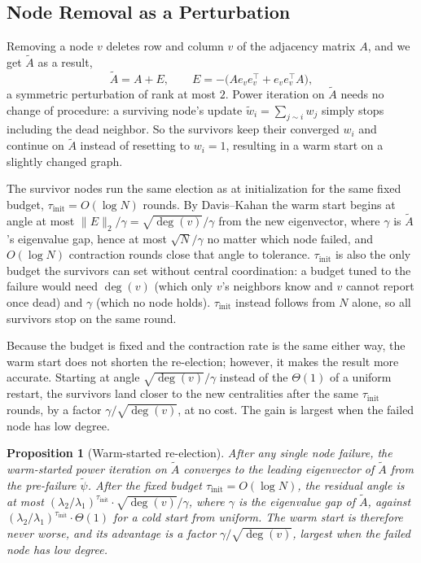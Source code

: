\documentclass[letterpaper]{article} %
\newtheorem{proposition}{Proposition}
\begin{document}
\subsection{Node Removal as a Perturbation}
\label{sec:perturbation}

Removing a node $v$ deletes row and column $v$ of the adjacency matrix $A$, and
we get $\tilde A$ as a result,
\[
	\tilde A = A + E, \qquad E = -\bigl(A e_v e_v^\top + e_v e_v^\top A\bigr),
\]
a symmetric perturbation of rank at most $2$. Power iteration on $\tilde A$
needs no change of procedure: a surviving node's update $\tilde w_i =
\sum_{j\sim i} w_j$ simply stops including the dead neighbor. So the survivors
keep their converged $w_i$ and continue on $\tilde A$ instead of resetting to
$w_i = 1$, resulting in a warm start on a slightly changed graph.

The survivor nodes run the same election as at initialization for the same
fixed budget, $\tau_{\mathrm{init}} = O(\log N)$ rounds. By Davis--Kahan
\citep{daviskahan1970} the warm start begins at angle at most $\|E\|_2/\gamma =
\sqrt{\deg(v)}/\gamma$ from the new eigenvector, where $\gamma$ is $\tilde A$'s
eigenvalue gap, hence at most $\sqrt{N}/\gamma$ no matter which node failed,
and $O(\log N)$ contraction rounds close that angle to tolerance.
$\tau_{\mathrm{init}}$ is also the only budget the survivors can set without
central coordination: a budget tuned to the failure would need $\deg(v)$ (which
only $v$'s neighbors know and $v$ cannot report once dead) and $\gamma$ (which
no node holds). $\tau_{\mathrm{init}}$ instead follows from $N$ alone, so all
survivors stop on the same round.

Because the budget is fixed and the contraction rate is the same either way,
the warm start does not shorten the re-election; however, it makes the result
more accurate. Starting at angle $\sqrt{\deg(v)}/\gamma$ instead of the
$\Theta(1)$ of a uniform restart, the survivors land closer to the new
centralities after the same $\tau_{\mathrm{init}}$ rounds, by a factor
$\gamma/\sqrt{\deg(v)}$, at no cost. The gain is largest when the failed node
has low degree.

\begin{proposition}[Warm-started re-election]
\label{prop:reelection}
After any single node failure, the warm-started power iteration on $\tilde A$
converges to the leading eigenvector of $\tilde A$ from the pre-failure
$\tilde\psi$. After the fixed budget $\tau_{\mathrm{init}} = O(\log N)$, the
residual angle is at most
$(\lambda_2/\lambda_1)^{\tau_{\mathrm{init}}}\cdot\sqrt{\deg(v)}/\gamma$,
where $\gamma$ is the eigenvalue gap of $\tilde A$, against
$(\lambda_2/\lambda_1)^{\tau_{\mathrm{init}}}\cdot\Theta(1)$ for a cold start
from uniform. The warm start is therefore never worse, and its advantage is a
factor $\gamma/\sqrt{\deg(v)}$, largest when the failed node has low degree.
\end{proposition}
\end{document}
